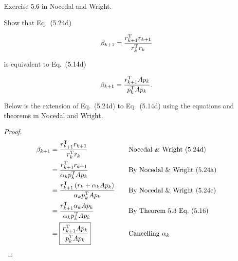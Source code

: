 \begin{problem}
  Exercise 5.6 in Nocedal and Wright.

  Show that Eq.~(5.24d)

  \[ \beta_{k+1} = \frac{r_{k+1}^{\textnormal{T}} r_{k+1}}{r_{k}^{\textnormal{T}} r_{k}} \]

  is equivalent to Eq.~(5.14d)

  \[ \beta_{k+1} = \frac{r_{k+1}^{\textnormal{T}} Ap_{k}}{p_{k}^{\textnormal{T}} Ap_{k}} \text{.}\]
\end{problem}


\noindent
Below is the extension of Eq.~(5.24d) to Eq.~(5.14d) using the equations and theorems in Nocedal and Wright.

\begin{proof}
  \begin{alignat*}{2}
    \beta_{k+1} &= \frac{r_{k+1}^{\textnormal{T}} r_{k+1}}{r_{k}^{\textnormal{T}} r_{k}} &\quad &\text{Nocedal \& Wright~(5.24d)} \\
    &= \frac{r_{k+1}^{\textnormal{T}} r_{k+1}}{\alpha_{k}p^{\textnormal{T}}_{k}Ap_{k}} &\quad &\text{By Nocedal \& Wright~(5.24a)} \\
    &= \frac{r_{k+1}^{\textnormal{T}} \left(r_{k} + \alpha_{k}Ap_{k}\right)}{\alpha_{k}p^{\textnormal{T}}_{k}Ap_{k}} &\quad &\text{By Nocedal \& Wright~(5.24c)} \\
    &= \frac{r_{k+1}^{\textnormal{T}} \alpha_{k}Ap_{k}}{\alpha_{k}p^{\textnormal{T}}_{k}Ap_{k}} &\quad &\text{By Theorem~5.3 Eq.~(5.16)} \\
    &=\boxed{\frac{r^{\textnormal{T}}_{k+1}Ap_{k}}{p^{\textnormal{T}}_{k}Ap_{k}}} &\quad &\text{Cancelling } \alpha_{k}
  \end{alignat*}
\end{proof}
